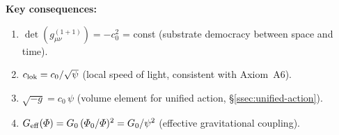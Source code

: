\begin{table}[htbp]
\medskip
\noindent\textbf{Key consequences:}
\begin{enumerate}[nosep]
  \item $\det(g^{(1+1)}_{\mu\nu}) = -c_0^2$ = const
        (substrate democracy between space and time).
  \item $c_{\rm lok} = c_0/\sqrt{\psi}$
        (local speed of light, consistent with Axiom~A6).
  \item $\sqrt{-g} = c_0\,\psi$
        (volume element for unified action, \S\ref{ssec:unified-action}).
  \item $G_{\rm eff}(\Phi) = G_0\,(\Phi_0/\Phi)^2 = G_0/\psi^2$
        (effective gravitational coupling).
\end{enumerate}
\end{table}
